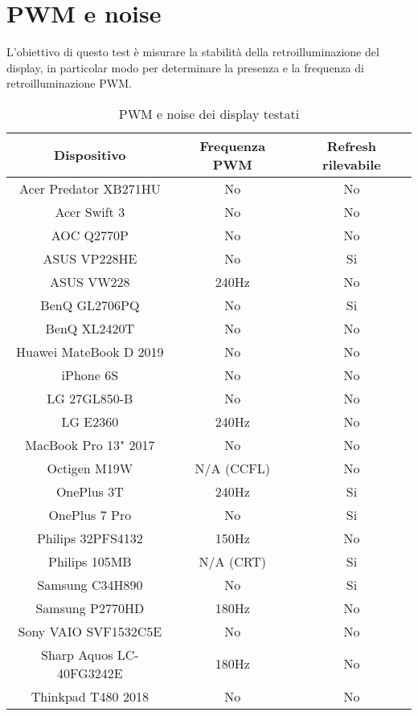 \section{PWM e noise}
L'obiettivo di questo test è misurare la stabilità della retroilluminazione del display, in particolar modo per determinare la presenza e la frequenza di retroilluminazione PWM.

\begin{table}[h!]
	\centering
	\begin{tabular}{|c|c|c|} 
		\hline
		\textbf{Dispositivo} & \textbf{Frequenza PWM} & \textbf{Refresh rilevabile}  \\ 
		\hline
		Acer Predator XB271HU & No & No \\ \hline
		Acer Swift 3 & No & No \\ \hline
		AOC Q2770P & No & No \\ \hline
		ASUS VP228HE & No & Si \\ \hline
		ASUS VW228 & 240Hz & No \\ \hline
		BenQ GL2706PQ & No & Si \\ \hline
		BenQ XL2420T & No & No \\ \hline
		Huawei MateBook D 2019 & No & No \\ \hline
		iPhone 6S & No & No \\ \hline
		LG 27GL850-B & No & No \\ \hline
		LG E2360 & 240Hz & No \\ \hline
		MacBook Pro 13" 2017 & No & No \\ \hline
		Octigen M19W & N/A (CCFL) & No \\ \hline
		OnePlus 3T & 240Hz & Si \\ \hline
		OnePlus 7 Pro & No & Si \\ \hline
		Philips 32PFS4132 & 150Hz & No \\ \hline
		Philips 105MB & N/A (CRT) & Si \\ \hline
		Samsung C34H890 & No & Si \\ \hline
		Samsung P2770HD & 180Hz & No \\ \hline
		Sony VAIO SVF1532C5E & No & No \\ \hline
		Sharp Aquos LC-40FG3242E & 180Hz & No \\ \hline
		Thinkpad T480 2018 & No & No \\ \hline
	\end{tabular}
	\caption{\label{tab:pwm_list}PWM e noise dei display testati}
\end{table}

